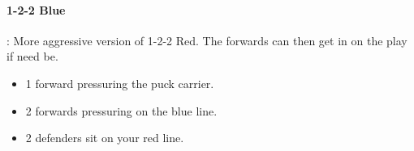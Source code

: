 \documentclass[10pt, french]{article}
\begin{document}
\begin{multicols*}{2}
\begin{minipage}{0.6\columnwidth}
\begin{tikzpicture}[x=0.75pt,y=0.75pt,yscale=-1,xscale=1]
\end{tikzpicture}
\end{minipage}

\paragraph{1-2-2 Blue}: More aggressive version of 1-2-2 Red. The forwards can then get in on the play if need be.

\begin{minipage}{0.4\columnwidth}
\begin{itemize}[leftmargin = *]
	\item	1 forward pressuring the puck carrier.
	\item	2 forwards pressuring on the blue line.
	\item	2 defenders sit on your red line.
\end{itemize}
\end{minipage}
\begin{minipage}{0.6\columnwidth}

\begin{tikzpicture}[x=0.75pt,y=0.75pt,yscale=-1,xscale=1]


\end{tikzpicture}
\end{minipage}
\end{multicols*}
\end{document}
